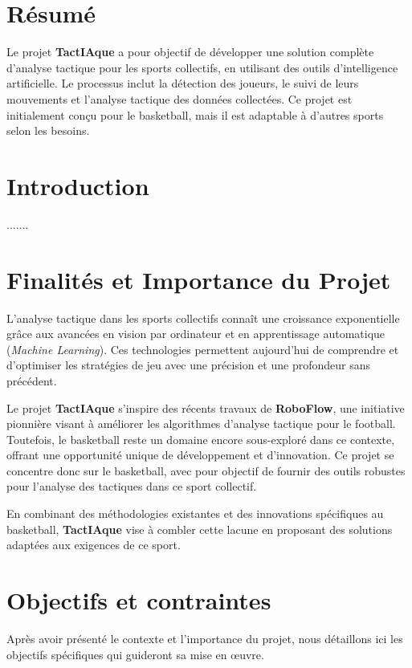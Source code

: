 \section*{Résumé}
Le projet \textbf{TactIAque} a pour objectif de développer une solution complète d’analyse tactique pour les sports collectifs, en utilisant des outils d’intelligence artificielle. Le processus inclut la détection des joueurs, le suivi de leurs mouvements et l’analyse tactique des données collectées. Ce projet est initialement conçu pour le basketball, mais il est adaptable à d’autres sports selon les besoins.
\thispagestyle{empty} 
\addtocounter{page}{-1} 
\thispagestyle{empty} 
\addtocounter{page}{-1}
\newpage
\section*{Introduction}
.......

\newpage
\section{Finalités et Importance du Projet}
L’analyse tactique dans les sports collectifs connaît une croissance exponentielle grâce aux avancées en vision par ordinateur et en apprentissage automatique (\textit{Machine Learning}). Ces technologies permettent aujourd’hui de comprendre et d’optimiser les stratégies de jeu avec une précision et une profondeur sans précédent.

Le projet \textbf{TactIAque} s’inspire des récents travaux de \textbf{RoboFlow}, une initiative pionnière visant à améliorer les algorithmes d’analyse tactique pour le football. Toutefois, le basketball reste un domaine encore sous-exploré dans ce contexte, offrant une opportunité unique de développement et d’innovation. Ce projet se concentre donc sur le basketball, avec pour objectif de fournir des outils robustes pour l’analyse des tactiques dans ce sport collectif.

En combinant des méthodologies existantes et des innovations spécifiques au basketball, \textbf{TactIAque} vise à combler cette lacune en proposant des solutions adaptées aux exigences de ce sport.

\section{Objectifs et contraintes}
Après avoir présenté le contexte et l'importance du projet, nous détaillons ici les objectifs spécifiques qui guideront sa mise en œuvre.
